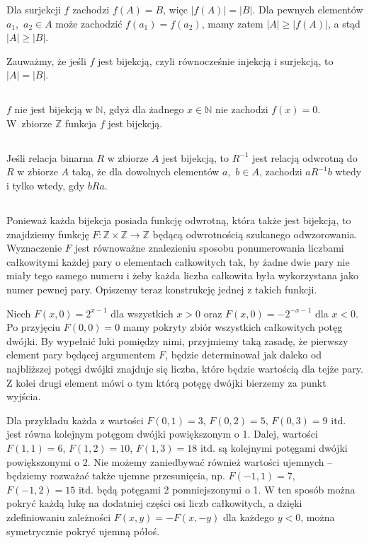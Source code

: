 \subsubsection{}
Dla surjekcji $f$ zachodzi $f(A)=B$, więc $|f(A)|=|B|$. Dla pewnych elementów $a_1$,~$a_2\in A$ może zachodzić $f(a_1)=f(a_2)$, mamy zatem $|A|\ge|f(A)|$, a stąd $|A|\ge|B|$.
\bigskip

\noindent Zauważmy, że jeśli $f$ jest bijekcją, czyli równocześnie injekcją i surjekcją, to $|A|=|B|$.

\subsection{} %
$f$ nie jest bijekcją w $\mathbb{N}$, gdyż dla żadnego $x\in\mathbb{N}$ nie zachodzi $f(x)=0$. W~zbiorze $\mathbb{Z}$ funkcja $f$ jest bijekcją.

\subsection{} %
Jeśli relacja binarna $R$ w zbiorze $A$ jest bijekcją, to $R^{-1}$ jest relacją odwrotną do $R$ w zbiorze $A$ taką, że dla dowolnych elementów $a$,~$b\in A$, zachodzi $aR^{-1}b$ wtedy i tylko wtedy, gdy $bRa$.

\subsection{} %
Ponieważ każda bijekcja posiada funkcję odwrotną, która także jest bijekcją, to znajdziemy funkcję $F\colon\mathbb{Z}\times\mathbb{Z}\to\mathbb{Z}$ będącą odwrotnością szukanego odwzorowania. Wyznaczenie $F$ jest równoważne znalezieniu sposobu ponumerowania liczbami całkowitymi każdej pary o elementach całkowitych tak, by żadne dwie pary nie miały tego samego numeru i żeby każda liczba całkowita była wykorzystana jako numer pewnej pary. Opiszemy teraz konstrukcję jednej z takich funkcji.

Niech $F(x,0)=2^{x-1}$ dla wszystkich $x>0$ oraz $F(x,0)=-2^{-x-1}$ dla $x<0$. Po przyjęciu $F(0,0)=0$ mamy pokryty zbiór wszystkich całkowitych potęg dwójki. By wypełnić luki pomiędzy nimi, przyjmiemy taką zasadę, że pierwszy element pary będącej argumentem $F$, będzie determinował jak daleko od najbliższej potęgi dwójki znajduje się liczba, które będzie wartością dla tejże pary. Z kolei drugi element mówi o tym którą potęgę dwójki bierzemy za punkt wyjścia.

Dla przykładu każda z wartości $F(0,1)=3$, $F(0,2)=5$, $F(0,3)=9$ itd. jest równa kolejnym potęgom dwójki powiększonym o 1. Dalej, wartości $F(1,1)=6$, $F(1,2)=10$, $F(1,3)=18$ itd. są kolejnymi potęgami dwójki powiększonymi o 2. Nie możemy zaniedbywać również wartości ujemnych -- będziemy rozważać także ujemne przesunięcia, np. $F(-1,1)=7$, $F(-1,2)=15$ itd. będą potęgami 2 pomniejszonymi o 1. W ten sposób można pokryć każdą lukę na dodatniej części osi liczb całkowitych, a dzięki zdefiniowaniu zależności $F(x,y)=-F(x,-y)$ dla każdego $y<0$, można symetrycznie pokryć ujemną półoś.


